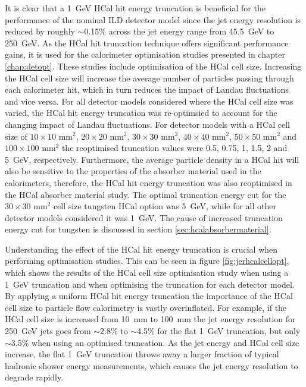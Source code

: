 It is clear that a 1~GeV HCal hit energy truncation is beneficial for the performance of the nominal ILD detector model since the jet energy resolution is reduced by roughly $\sim$0.15\% across the jet energy range from 45.5~GeV to 250~GeV.  As the HCal hit truncation technique offers significant performance gains, it is used for the calorimeter optimisation studies presented in chapter \ref{chap:detopt}.  These studies include optimisation of the HCal cell size.  Increasing the HCal cell size will increase the average number of particles passing through each calorimeter hit, which in turn reduces the impact of Landau fluctuations and vice versa.  For all detector models considered where the HCal cell size was varied, the HCal hit energy truncation was re-optimsied to account for the changing impact of Landau fluctuations.  For detector models with a HCal cell size of $10 \times 10\text{ mm}^{2}$, $20 \times 20\text{ mm}^{2}$, $30 \times 30\text{ mm}^{2}$, $40 \times 40\text{ mm}^{2}$, $50 \times 50\text{ mm}^{2}$ and $100 \times 100\text{ mm}^{2}$ the reoptimised truncation values were 0.5, 0.75, 1, 1.5, 2 and 5~GeV{,} respectively.  Furthermore, the average particle density in a HCal hit will also be sensitive to the properties of the absorber material used in the calorimeters, therefore, the HCal hit energy truncation was also reoptimised in the HCal absorber material study.  The optimal truncation energy cut for the $30 \times 30\text{ mm}^{2}$ cell size tungsten HCal option was 5~GeV, while for all other detector models considered it was 1~GeV.  The cause of increased truncation energy cut for tungsten is discussed in section \ref{sec:hcalabsorbermaterial}.

Understanding the effect of the HCal hit energy truncation is crucial when performing optimisation studies.  This can be seen in figure \ref{fig:jerhcalcellopt}, which shows the results of the HCal cell size optimisation study when using a 1~GeV truncation and when optimising the truncation for each detector model.  By applying a uniform HCal hit energy truncation the importance of the HCal cell size to particle flow calorimetry is vastly overinflated.  For example, if the HCal cell size is increased from 10~mm to 100~mm the jet energy resolution for 250~GeV jets goes from $\sim$2.8\% to $\sim$4.5\% for the flat 1~GeV truncation, but only $\sim$3.5\% when using an optimised truncation.  As the jet energy and HCal cell size increase, the flat 1~GeV truncation throws away a larger fraction of typical hadronic shower energy measurements, which causes the jet energy resolution to degrade rapidly.  

